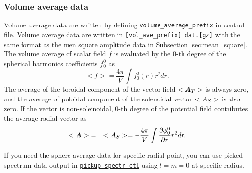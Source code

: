 \subsubsection{Volume average data}
Volume average data are written by defining {\tt volume\_average\_prefix} in control file. Volume average data are written in \verb|[vol_ave_prefix].dat.[gz]| with the same format as the men square amplitude data in Subsection \ref{sec:mean_square}. The volume average of scalar field $f$ is evaluated by the 0-th degree of the spherical harmonics coefficients $f_{0}^{0}$ as
%
\begin{equation}
<f> =   \frac{4\pi}{V} \int f_{0}^{0}(r) r^{2} dr.
\end{equation}
%
The average of the toroidal component of the vector field $<\mbox{\boldmath$A$}_{T}>$ is always zero, and the average of poloidal component of the solenoidal vector  $<\mbox{\boldmath$A$}_{S}>$ is also zero. If the vector is non-soleinoidal, 0-th degree of the potential field contributes the average radial vector as
%
\begin{eqnarray}
<\mbox{\boldmath$A$}> &=& <\mbox{\boldmath$A$}_{S}>  =  - \frac{4\pi}{V}
\int \frac{\partial \phi_{0}^{0}}{\partial r} r^{2} dr.
\end{eqnarray}
%

If you need the sphere average data for specific radial point, you can use picked spectrum data output in \hyperref[sec:pickup_spectr_ctl]{\tt pickup\_spectr\_ctl}  using $l = m = 0$ at specific radius.

